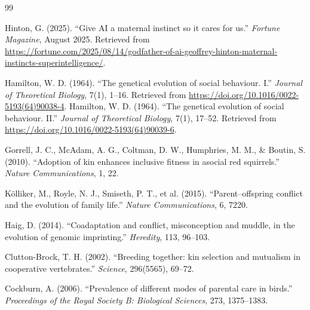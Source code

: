 
\newpage
{}
\begin{thebibliography}{99}





Hinton, G. (2025). “Give AI a maternal instinct so it cares for us.”  
\textit{Fortune Magazine}, August 2025.  
Retrieved from \url{https://fortune.com/2025/08/14/godfather-of-ai-geoffrey-hinton-maternal-instincts-superintelligence/}.

Hamilton, W. D. (1964).
“The genetical evolution of social behaviour. I.”
\textit{Journal of Theoretical Biology}, 7(1), 1–16.
Retrieved from \url{https://doi.org/10.1016/0022-5193(64)90038-4}.
Hamilton, W. D. (1964).
“The genetical evolution of social behaviour. II.”
\textit{Journal of Theoretical Biology}, 7(1), 17–52.
Retrieved from \url{https://doi.org/10.1016/0022-5193(64)90039-6}.

Gorrell, J. C., McAdam, A. G., Coltman, D. W., Humphries, M. M., \& Boutin, S. (2010).
``Adoption of kin enhances inclusive fitness in asocial red squirrels.''
\textit{Nature Communications}, 1, 22.

Kölliker, M., Royle, N. J., Smiseth, P. T., et al. (2015).
``Parent–offspring conflict and the evolution of family life.''
\textit{Nature Communications}, 6, 7220.


Haig, D. (2014).
``Coadaptation and conflict, misconception and muddle, in the evolution of genomic imprinting.''
\textit{Heredity}, 113, 96–103.

Clutton-Brock, T. H. (2002).
``Breeding together: kin selection and mutualism in cooperative vertebrates.''
\textit{Science}, 296(5565), 69–72.

Cockburn, A. (2006).
``Prevalence of different modes of parental care in birds.''
\textit{Proceedings of the Royal Society B: Biological Sciences}, 273, 1375–1383.


\end{thebibliography}
